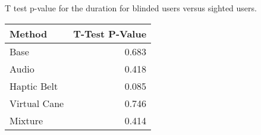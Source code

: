 
\centering
\caption{T test p-value for the duration for blinded users versus sighted users.}
\label{tab:ttest_duration}
\begin{tabular}{lr}
\toprule
      Method &  T-Test P-Value \\
\midrule
        Base &           0.683 \\
       Audio &           0.418 \\
 Haptic Belt &           0.085 \\
Virtual Cane &           0.746 \\
     Mixture &           0.414 \\
\bottomrule
\end{tabular}
